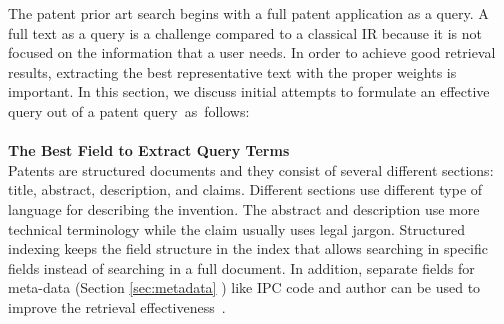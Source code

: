 The patent prior art search begins with a full patent application as a query. A full text as a query is a challenge compared to a classical IR because it is not focused on the information that a user needs. In order to achieve good retrieval results, extracting the best representative text with the proper weights is important. In this section, we discuss initial attempts to formulate an effective query out of a patent query~as~follows:
\\\\
\textbf{The Best Field to Extract Query Terms}
\ \\
Patents are structured documents and they consist of several different sections: title, abstract, description, and claims. Different sections use different type of language for describing the invention. The abstract and description use more technical terminology while the claim usually uses legal jargon. Structured indexing keeps the field structure in the index that allows searching in specific fields instead of searching in a full document. In addition, separate fields for meta-data (Section \ref{sec:metadata} ) like IPC code and author can be used to improve the retrieval effectiveness~\citep{magdy2010exploring}. 

